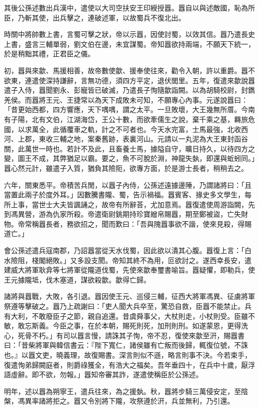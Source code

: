 \begin{pinyinscope}
其後公孫述數出兵漢中，遣使以大司空扶安王印綬授囂。囂自以與述敵國，恥為所臣，乃斬其使，出兵擊之，連破述軍，以故蜀兵不復北出。

時關中將帥數上書，言蜀可擊之狀，帝以示囂，因使討蜀，以效其信。囂乃遣長史上書，盛言三輔單弱，劉文伯在邊，未宜謀蜀。帝知囂欲持兩端，不願天下統一，於是稍黜其禮，正君臣之儀。

初，囂與來歙、馬援相善，故帝數使歙、援奉使往來，勸令入朝，許以重爵。囂不欲東，連遣使深持謙辭，言無功德，須四方平定，退伏閭里。五年，復遣來歙說囂遣子入侍，囂聞劉永、彭寵皆已破滅，乃遣長子恂隨歙詣闕。以為胡騎校尉，封鐫羌侯。而囂將王元、王捷常以為天下成敗未可知，不願專心內事。元遂說囂曰：「昔更始西都，四方響應，天下喁喁，謂之太平。一旦敗壞，大王幾無所厝。今南有子陽，北有文伯，江湖海岱，王公十數，而欲牽儒生之說，棄千乘之基，羇旅危國，以求萬全，此循覆車之軌，計之不可者也。今天水完富，士馬最強，北收西河、上郡，東收三輔之地，案秦舊跡，表裏河山。元請以一丸泥為大王東封函谷關，此萬世一時也。若計不及此，且畜養士馬，據隘自守，曠日持久，以待四方之變，圖王不成，其弊猶足以霸。要之，魚不可脫於淵，神龍失埶，即還與蚯蚓同。」囂心然元計，雖遣子入質，猶負其險阨，欲專方面，於是游士長者，稍稍去之。

六年，關東悉平。帝積苦兵閒，以囂子內侍，公孫述遠據邊陲，乃謂諸將曰：「且當置此兩子於度外耳。」因數騰書隴、蜀，告示禍福。囂賓客、掾史多文學生，每所上事，當世士大夫皆諷誦之，故帝有所辭荅，尤加意焉。囂復遣使周游詣闕，先到馮異營，游為仇家所殺。帝遣衛尉銚期持珍寶繒帛賜囂，期至鄭被盜，亡失財物。帝常稱囂長者，務欲招之，聞而歎曰：「吾與隗囂事欲不諧，使來見殺，得賜道亡。」

會公孫述遣兵寇南郡，乃詔囂當從天水伐蜀，因此欲以潰其心腹。囂復上言：「白水險阻，棧閣絕敗。」又多設支閡。帝知其終不為用，叵欲討之。遂西幸長安，遣建威大將軍耿弇等七將軍從隴道伐蜀，先使來歙奉璽書喻旨。囂疑懼，即勒兵，使王元據隴坻，伐木塞道，謀欲殺歙。歙得亡歸。

諸將與囂戰，大敗，各引退。囂因使王元、巡侵三輔，征西大將軍馮異、征虜將軍祭遵等擊破之。囂乃上疏謝曰：「吏人聞大兵卒至，驚恐自救，臣囂不能禁止。兵有大利，不敢廢臣子之節，親自追還。昔虞舜事父，大杖則走，小杖則受。臣雖不敏，敢忘斯義。今臣之事，在於本朝，賜死則死，加刑則刑。如遂蒙恩，更得洗心，死骨不朽。」有司以囂言慢，請誅其子恂，帝不忍，復使來歙至汧，賜囂書曰：「昔柴將軍與韓信書云：『陛下寬仁，諸侯雖有亡叛而後歸，輒復位號，不誅也。』以囂文吏，曉義理，故復賜書。深言則似不遜，略言則事不決。今若束手，復遣恂弟歸闕庭者，則爵祿獲全，有浩大之福矣。吾年垂四十，在兵中十歲，厭浮語虛辭。即不欲，勿報。」囂知帝審其詐，遂遣使稱臣於公孫述。

明年，述以囂為朔寧王，遣兵往來，為之援埶。秋，囂將步騎三萬侵安定，至陰槃，馮異率諸將拒之。囂又令別將下隴，攻祭遵於汧，兵並無利，乃引還。


\end{pinyinscope}
